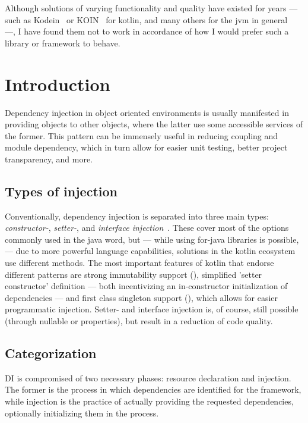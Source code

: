 Although solutions of varying functionality and quality have existed for years --- such as Kodein~\cite{Kodein} or KOIN~\cite{KOIN} for kotlin, and many others for the jvm in general~\cite{JavaCdi} ---, I have found them not to work in accordance of how I would prefer such a library or framework to behave.

	\section{Introduction}
	
	Dependency injection in object oriented environments is usually manifested in providing objects to other objects, where the latter use some accessible services of the former. This pattern can be immensely useful in reducing coupling and module dependency, which in turn allow for easier unit testing, better project transparency, and more.
	
		\subsection*{Types of injection}
		
		Conventionally, dependency injection is separated into three main types: \emph{constructor-}, \emph{setter-}, and \emph{interface injection}~\cite{DiTypes}. These cover most of the options commonly used in the java word, but --- while using for-java libraries is possible, --- due to more powerful language capabilities, solutions in the kotlin ecosystem use different methods. The most important features of kotlin that endorse different patterns are strong immutability support (), simplified 'setter constructor' definition --- both incentivizing an in-constructor initialization of dependencies --- and first class singleton support (), which allows for easier programmatic injection. Setter- and interface injection is, of course, still possible (through nullable or  properties), but result in a reduction of code quality.
		
		\subsection*{Categorization}
	
		DI is compromised of two necessary phases: resource declaration and injection. The former is the process in which dependencies are identified for the framework, while injection is the practice of actually providing the requested dependencies, optionally initializing them in the process.
		
